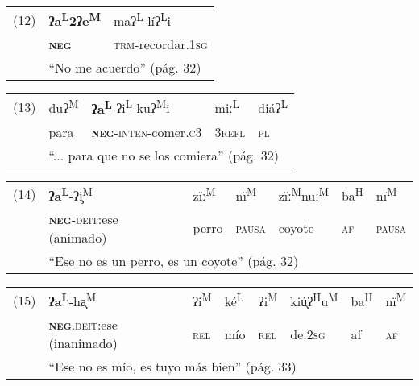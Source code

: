 {\setmainfont{Charis SIL}
    
\begin{tabular}{lll}
(12) & \textbf{ʔa\textsuperscript{L}2ʔe\textsuperscript{M}} & maʔ\textsuperscript{L}-líʔ\textsuperscript{L}i \\
& \textsc{\textbf{neg}} & \textsc{trm}-recordar.\textsc{1sg} \\
& \multicolumn{2}{l}{``No me acuerdo'' (pág. 32)}
\end{tabular} \vspace{0.5cm}

\begin{tabular}{lllll}
(13) & duʔ\textsuperscript{M} &\textbf{ ʔa\textsuperscript{L}}-ʔi\textsuperscript{L}-kuʔ\textsuperscript{M}i & miː\textsuperscript{L} & diáʔ\textsuperscript{L} \\
& para & \textsc{\textbf{neg}}-\textsc{inten}-comer.\textsc{c}3 & 3\textsc{refl} & \textsc{pl} \\
& \multicolumn{4}{l}{``... para que no se los comiera'' (pág. 32)}
\end{tabular} \vspace{0.5cm}

\begin{tabular}{lllllll}
(14) & \textbf{ʔa\textsuperscript{L}}-ʔi̧\textsuperscript{M} & zïː\textsuperscript{M} & nï\textsuperscript{M} & zïː\textsuperscript{M}nuː\textsuperscript{M} & ba\textsuperscript{H} & nï\textsuperscript{M} \\
& \textsc{\textbf{neg}-deit}:ese (animado) & perro & \textsc{pausa} & coyote & \textsc{af} & \textsc{pausa} \\
& \multicolumn{6}{l}{``Ese no es un perro, es un coyote'' (pág. 32)}
\end{tabular} \vspace*{0.5cm}
        
\begin{tabular}{llllllll}
(15) & \textbf{ʔa\textsuperscript{L}}-ha̧\textsuperscript{M}	& ʔi\textsuperscript{M} & ké\textsuperscript{L} & ʔi\textsuperscript{M} & kiú̧ʔ\textsuperscript{H}u\textsuperscript{M} & ba\textsuperscript{H} & nï\textsuperscript{M} \\
& \textsc{\textbf{neg}.deit}:ese (inanimado) & \textsc{rel} & mío & \textsc{rel} & de.\textsc{2sg} & af & \textsc{af} \\
& \multicolumn{7}{l}{``Ese no es mío, es tuyo más bien'' (pág. 33)}	
\end{tabular} \vspace{1cm}

}

